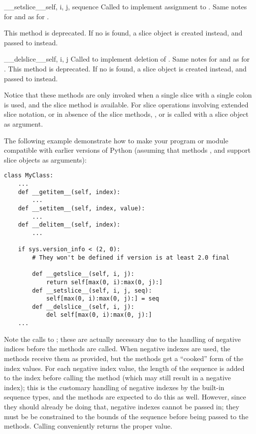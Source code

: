 \begin{methoddesc}{__setslice__}{self, i, j, sequence}
Called to implement assignment to .
Same notes for  and  as for .

This method is deprecated. If no  is found, a
slice object is created instead, and passed to 
instead.
\end{methoddesc}

\begin{methoddesc}{__delslice__}{self, i, j}
Called to implement deletion of .
Same notes for  and  as for .
This method is deprecated. If no  is found, a
slice object is created instead, and passed to 
instead.
\end{methoddesc}

Notice that these methods are only invoked when a single slice with a
single colon is used, and the slice method is available.  For slice
operations involving extended slice notation, or in absence of the
slice methods, ,  or
 is called with a slice object as argument.

The following example demonstrate how to make your program or module
compatible with earlier versions of Python (assuming that methods
,  and 
support slice objects as arguments):

\begin{verbatim}
class MyClass:
    ...
    def __getitem__(self, index):
        ...
    def __setitem__(self, index, value):
        ...
    def __delitem__(self, index):
        ...

    if sys.version_info < (2, 0):
        # They won't be defined if version is at least 2.0 final

        def __getslice__(self, i, j):
            return self[max(0, i):max(0, j):]
        def __setslice__(self, i, j, seq):
            self[max(0, i):max(0, j):] = seq
        def __delslice__(self, i, j):
            del self[max(0, i):max(0, j):]
    ...
\end{verbatim}

Note the calls to ; these are actually necessary due
to the handling of negative indices before the
 methods are called.  When negative indexes are
used, the  methods receive them as provided, but
the  methods get a ``cooked'' form of the index
values.  For each negative index value, the length of the sequence is
added to the index before calling the method (which may still result
in a negative index); this is the customary handling of negative
indexes by the built-in sequence types, and the 
methods are expected to do this as well.  However, since they should
already be doing that, negative indexes cannot be passed in; they must
be be constrained to the bounds of the sequence before being passed to
the  methods.
Calling  conveniently returns the proper value.


